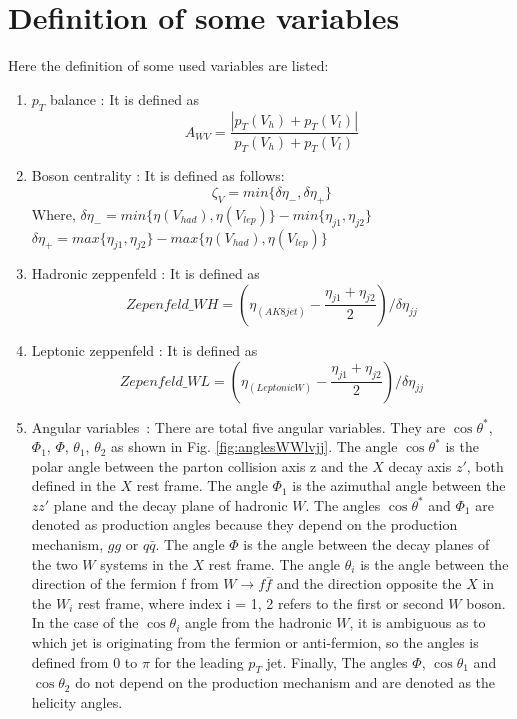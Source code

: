 \section{Definition of some variables}
Here the definition of some used variables are listed:
\begin{enumerate}
	\item $p_T$ balance : It is defined as 
			\begin{equation} \label{eq:ptBalance}
			A_{WV} = \frac{|p_T(V_h) + p_T(V_l)|}{p_T(V_h) + p_T(V_l)} 
			\end{equation}

	\item Boson centrality : It is defined as follows: 
			\begin{equation} \label{eq:bosonCentrality}
			\zeta_V = min\{\delta \eta_-, \delta \eta_+\} 
			\end{equation} 
			Where, \newline 
			$\delta \eta_- = min\{\eta(V_{had}), \eta(V_{lep})\}-min\{\eta_{j1},\eta_{j2}\}$ \newline 
			$\delta \eta_+ = max\{\eta_{j1},\eta_{j2}\}-max\{\eta(V_{had}), \eta(V_{lep})\}$

	\item Hadronic zeppenfeld : It is defined as 
		\begin{equation} \label{eq:HadZep}
		Zepenfeld\_WH = (\eta_{(AK8 jet)} - \frac{\eta_{j1} + \eta_{j2}}{2})/\delta \eta_{jj}
		\end{equation}

	\item Leptonic zeppenfeld : It is defined as 
		\begin{equation} \label{eq:LepZep}
		Zepenfeld\_WL = (\eta_{(Leptonic W)} - \frac{\eta_{j1} + \eta_{j2}}{2})/\delta \eta_{jj}
		\end{equation}

	\item Angular variables~\cite{AN:2012-463}: There are total five angular variables. They are $\cos\theta^{\ast}$, $\Phi_1$, $\Phi$, $\theta_1$, $\theta_2$ as shown in Fig. \ref{fig:anglesWWlvjj}. The angle $\cos\theta^{\ast}$ is the polar angle between the parton collision axis z and the $X$ decay axis $z'$, both defined in the $X$ rest frame. The angle $\Phi_1$ is the azimuthal angle between the
$zz'$ plane and the decay plane of hadronic $W$. The angles $\cos\theta^{\ast}$ and $\Phi_1$ are denoted as production angles because they depend on the production mechanism, $gg$ or $q\bar{q}$. The angle $\Phi$ is the angle between the decay planes of the two $W$ systems in the $X$ rest frame. The angle $\theta_i$ is the angle between the direction of the fermion f from $W \to f\bar{f}$ and the direction opposite the $X$ in the $W_i$ rest frame, where index i = 1, 2 refers to the first or second $W$ boson.  In the case of the $\cos\theta_i$ angle from the hadronic $W$, it is ambiguous as to which jet is originating from the fermion or
anti-fermion, so the angles is defined from $0$ to $\pi$ for the leading $p_T$ jet.  Finally, The angles $\Phi$, $\cos\theta_1$ and $\cos\theta_2$ do not depend on the production mechanism and are denoted as the helicity angles.
		
\end{enumerate}
